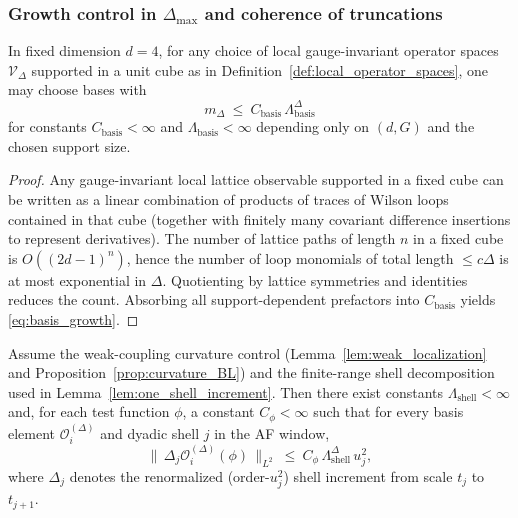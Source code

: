 \subsubsection{Growth control in \texorpdfstring{$\Delta_{\max}$}{Delta\_max} and coherence of truncations}

\begin{lemma}
\label{lem:basis_growth}
In fixed dimension $d=4$, for any choice of local gauge-invariant operator spaces $\mathscr V_{\Delta}$ supported in a unit cube as in
Definition~\ref{def:local_operator_spaces}, one may choose bases with
\begin{equation}\label{eq:basis_growth}
 m_{\Delta}\ \le\ C_{\mathrm{basis}}\,\Lambda_{\mathrm{basis}}^{\Delta}
\end{equation}
for constants $C_{\mathrm{basis}}<\infty$ and $\Lambda_{\mathrm{basis}}<\infty$ depending only on $(d,G)$ and the chosen support size.
\end{lemma}

\begin{proof}
Any gauge-invariant local lattice observable supported in a fixed cube can be written as a linear combination of products of traces of Wilson loops
contained in that cube (together with finitely many covariant difference insertions to represent derivatives).
The number of lattice paths of length $n$ in a fixed cube is $O((2d-1)^n)$, hence the number of loop monomials of total length $\le c\Delta$
is at most exponential in $\Delta$.
Quotienting by lattice symmetries and identities reduces the count.
Absorbing all support-dependent prefactors into $C_{\mathrm{basis}}$ yields \eqref{eq:basis_growth}.
\end{proof}

\begin{lemma}
\label{lem:one_shell_dimension_growth}
Assume the weak-coupling curvature control (Lemma~\ref{lem:weak_localization} and Proposition~\ref{prop:curvature_BL}) and the finite-range shell
decomposition used in Lemma~\ref{lem:one_shell_increment}.
Then there exist constants $\Lambda_{\mathrm{shell}}<\infty$ and, for each test function $\phi$, a constant $C_{\phi}<\infty$ such that for every
basis element $\mathcal O_i^{(\Delta)}$ and dyadic shell $j$ in the AF window,
\begin{equation}\label{eq:one_shell_dim_growth}
 \bigl\|\,\Delta_j\mathcal O_i^{(\Delta)}(\phi)\,\bigr\|_{L^2}
 \ \le\ C_{\phi}\,\Lambda_{\mathrm{shell}}^{\Delta}\,u_j^2,
\end{equation}
where $\Delta_j$ denotes the renormalized (order-$u_j^2$) shell increment from scale $t_j$ to $t_{j+1}$.
\end{lemma}

